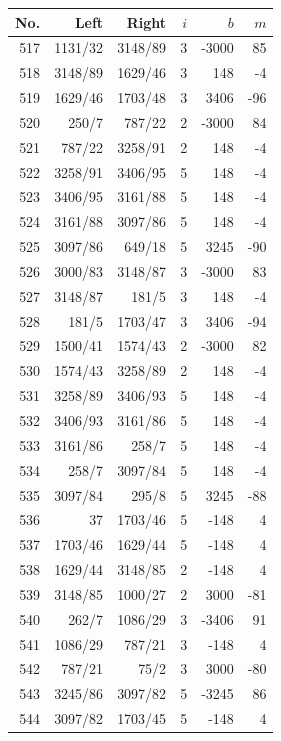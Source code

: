 \documentclass[11pt,a4paper]{article}
\begin{document}
\noindent\begin{minipage}[t]{.49\linewidth}\centering\footnotesize\setlength{\tabcolsep}{2pt}\renewcommand{\arraystretch}{1.09}
\begin{tabular*}{\linewidth}{@{}r@{\extracolsep{\fill}}rrrrr@{}}\toprule
No. & Left & Right & $i$ & $b$ & $m$\\\midrule
517 & 1131/32 & 3148/89 & 3 & -3000 & 85\\
518 & 3148/89 & 1629/46 & 3 & 148 & -4\\
519 & 1629/46 & 1703/48 & 3 & 3406 & -96\\
520 & 250/7 & 787/22 & 2 & -3000 & 84\\
521 & 787/22 & 3258/91 & 2 & 148 & -4\\
522 & 3258/91 & 3406/95 & 5 & 148 & -4\\
523 & 3406/95 & 3161/88 & 5 & 148 & -4\\
524 & 3161/88 & 3097/86 & 5 & 148 & -4\\
525 & 3097/86 & 649/18 & 5 & 3245 & -90\\
526 & 3000/83 & 3148/87 & 3 & -3000 & 83\\
527 & 3148/87 & 181/5 & 3 & 148 & -4\\
528 & 181/5 & 1703/47 & 3 & 3406 & -94\\
529 & 1500/41 & 1574/43 & 2 & -3000 & 82\\
530 & 1574/43 & 3258/89 & 2 & 148 & -4\\
531 & 3258/89 & 3406/93 & 5 & 148 & -4\\
532 & 3406/93 & 3161/86 & 5 & 148 & -4\\
533 & 3161/86 & 258/7 & 5 & 148 & -4\\
534 & 258/7 & 3097/84 & 5 & 148 & -4\\
535 & 3097/84 & 295/8 & 5 & 3245 & -88\\
536 & 37 & 1703/46 & 5 & -148 & 4\\
537 & 1703/46 & 1629/44 & 5 & -148 & 4\\
538 & 1629/44 & 3148/85 & 2 & -148 & 4\\
539 & 3148/85 & 1000/27 & 2 & 3000 & -81\\
540 & 262/7 & 1086/29 & 3 & -3406 & 91\\
541 & 1086/29 & 787/21 & 3 & -148 & 4\\
542 & 787/21 & 75/2 & 3 & 3000 & -80\\
543 & 3245/86 & 3097/82 & 5 & -3245 & 86\\
544 & 3097/82 & 1703/45 & 5 & -148 & 4\\

\end{tabular*}
\end{minipage}
\end{document}
